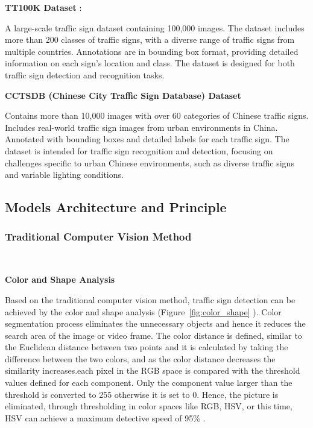 \documentclass[letterpaper, 10 pt, conference]{ieeeconf}
\begin{document}
\textbf{TT100K Dataset} \cite{Zhe_2016_CVPR}:

A large-scale traffic sign dataset containing 100,000 images. The dataset includes more than 200 classes of traffic signs, with a diverse range of traffic signs from multiple countries. Annotations are in bounding box format, providing detailed information on each sign's location and class. The dataset is designed for both traffic sign detection and recognition tasks.

\textbf{CCTSDB (Chinese City Traffic Sign Database) Dataset} \cite{zhang2024robust}

Contains more than 10,000 images with over 60 categories of Chinese traffic signs. Includes real-world traffic sign images from urban environments in China. Annotated with bounding boxes and detailed labels for each traffic sign. The dataset is intended for traffic sign recognition and detection, focusing on challenges specific to urban Chinese environments, such as diverse traffic signs and variable lighting conditions.

\subsection{Models Architecture and Principle}

\subsubsection{Traditional Computer Vision Method}\

\textbf{Color and Shape Analysis}

Based on the traditional computer vision method, traffic sign detection can be achieved by the color and shape analysis (Figure~\ref{fig:color_shape} \cite{swathi2017automatic}). Color segmentation process eliminates the unnecessary objects and hence it reduces the search area of the image or video frame. The color distance is defined, similar to the Euclidean distance between two points and it is calculated by taking the difference between the two colors, and as the color distance decreases the similarity increases.each pixel in the RGB space is compared with the threshold values defined for each component. Only the component value larger than the threshold is converted to 255 otherwise it is set to 0. Hence, the picture is eliminated, through thresholding in color spaces like RGB, HSV, or this time, HSV can achieve a maximum detective speed of 95\% .
\end{document}
